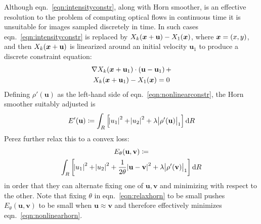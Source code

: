 Although eqn.~\eqref{eqn:intensityconstr}, along with Horn smoother, is an effective resolution to the problem of computing optical flows in continuous time it is unsuitable for images sampled discretely in time.
%
In such cases eqn.~\eqref{eqn:intensityconstr} is replaced by \( X_k(\bm{x} + \mathbf{u}) - X_1(\bm{x})\), where \(\bm{x} = (x,y)\), and then \( X_k(\bm{x} + \mathbf{u})\) is  linearized around an initial velocity \(\mathbf{u}_1\) to produce a discrete constraint equation:
\begin{multline}
	\nabla X_k (\bx + \mathbf{u}_1)\cdot (\mathbf{u} - \mathbf{u}_1)\, + \\ X_k(\bx + \mathbf{u}_1)  -  X_1(\bx) = 0
	\label{eqn:nonlinearconstr}
\end{multline}
Defining \(\rho'(\mathbf{u})\) as the left-hand side of eqn.~\eqref{eqn:nonlinearconstr}, the Horn smoother suitably adjusted is
\begin{equation}
	E'(\mathbf{u}) \coloneqq \int_R \left[ \abs{ u_1 }^2 + \abs{ u_2 }^2 + \lambda \abs{ \rho'(\mathbf{u}) }_1 \right] \dif R
	\label{eqn:nonlinearhorn}
\end{equation}
%
Perez \etal\cite{perez2013tv} further relax this to a convex loss:
\begin{multline}
	E_{\theta}(\mathbf{u}, \mathbf{v}) \coloneqq \\
	\int_R \left[ \abs{ u_1 }^2 + \abs{ u_2 }^2 + \frac{1}{2\theta}\abs{ \mathbf{u} - \mathbf{v} }^2 + \lambda \abs{ \rho'(\mathbf{v}) }_1 \right] \dif R
	\label{eqn:relaxhorn}
\end{multline}
in order that they can alternate fixing one of \(\mathbf{u}, \mathbf{v}\) and minimizing with respect to the other.
%
Note that fixing \(\theta\) in eqn.~\eqref{eqn:relaxhorn} to be small pushes \(E_{\theta}(\mathbf{u}, \mathbf{v})\) to be small when \(\mathbf{u}\approx \mathbf{v}\) and therefore effectively minimizes eqn.~\eqref{eqn:nonlinearhorn}.
